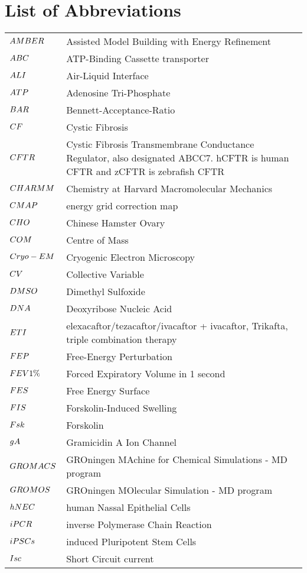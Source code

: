 \chapter*{List of Abbreviations}
\label{chap:abbrev}

\begin{center}
\begin{bfseries}
\newcommand\nomenclature[2]{#1 & #2 \\}
\begin{longtable}{@{}p{3cm}@{}p{\dimexpr\textwidth-1cm\relax}@{}}
\nomenclature{${\small AMBER}$}    {Assisted Model Building with Energy Refinement}
\nomenclature{${\small ABC}$}   {ATP-Binding Cassette transporter}
\nomenclature{${\small ALI}$}   {Air-Liquid Interface}
\nomenclature{${\small ATP}$}      {Adenosine Tri-Phosphate}
\nomenclature{${\small BAR}$}      {Bennett-Acceptance-Ratio}
\nomenclature{${\small CF}$}        {Cystic Fibrosis}
\nomenclature{${\small CFTR}$}      {Cystic Fibrosis Transmembrane Conductance Regulator, also designated ABCC7. hCFTR is human CFTR and zCFTR is zebrafish CFTR}
\nomenclature{${\small CHARMM}$}   {Chemistry at Harvard Macromolecular Mechanics}
\nomenclature{${\small CMAP}$}     {energy grid correction map}
\nomenclature{${\small CHO}$}      {Chinese Hamster Ovary}
\nomenclature{${\small COM}$}      {Centre of Mass}
\nomenclature{${\small Cryo-EM}$}  {Cryogenic Electron Microscopy}
\nomenclature{${\small CV}$}       {Collective Variable}
\nomenclature{${\small DMSO}$}     {Dimethyl Sulfoxide}
\nomenclature{${\small DNA}$}      {Deoxyribose Nucleic Acid}
\nomenclature{${\small ETI}$}      {elexacaftor/tezacaftor/ivacaftor + ivacaftor, Trikafta, triple combination therapy}
\nomenclature{${\small FEP}$}      {Free-Energy Perturbation}
\nomenclature{${\small FEV1\%}$}   {Forced Expiratory Volume in 1 second}
\nomenclature{${\small FES}$}      {Free Energy Surface}
\nomenclature{${\small FIS}$}      {Forskolin-Induced Swelling}
\nomenclature{${\small Fsk}$}      {Forskolin}
\nomenclature{${\small gA}$}       {Gramicidin A Ion Channel}
\nomenclature{${\small GROMACS}$}  {GROningen MAchine for Chemical Simulations - MD program}
\nomenclature{${\small GROMOS}$}   {GROningen MOlecular Simulation - MD program}
\nomenclature{${\small hNEC}$}     {human Nassal Epithelial Cells}
\nomenclature{${\small iPCR}$}     {inverse Polymerase Chain Reaction}
\nomenclature{${\small iPSCs}$}    {induced Pluripotent Stem Cells}
\nomenclature{${\small Isc}$}      {Short Circuit current}

\end{longtable}
\end{bfseries}
\end{center}
